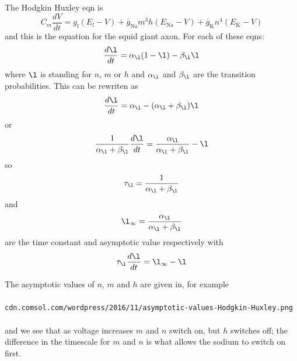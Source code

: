 \documentclass[a4paper,12pt]{article}
\begin{document}
\begin{enumerate}
The Hodgkin Huxley eqn is
\begin{equation}
C_m\frac{dV}{dt}=g_l(E_l-V)+\bar{g}_\text{Na}m^3h(E_\text{Na}-V)+\bar{g}_\text{K}n^4(E_\text{K}-V)
\end{equation}
and this is the equation for the squid giant axon. For each of these eqns:
\begin{equation}
\frac{d\l}{dt} =\alpha_{\l} (1-\l)-\beta_{\l} \l
\end{equation}
where $\l$ is standing for $n$, $m$ or $h$ and $\alpha_{\l}$ and
$\beta_{\l}$ are the transition probabilities. This can be rewriten as
\begin{equation}
\frac{d\l}{dt} =\alpha_{\l}-(\alpha_{\l}+\beta_{\l}) \l
\end{equation}
or
\begin{equation}
\frac{1}{\alpha_{\l}+\beta_{\l}}\frac{d\l}{dt} =\frac{\alpha_{\l}}{\alpha_{\l}+\beta_{\l}}- \l
\end{equation}
so 
\begin{equation}
\tau_{\l}=\frac{1}{\alpha_{\l}+\beta_{\l}}
\end{equation}
and
\begin{equation}
\l_\infty=\frac{\alpha_{\l}}{\alpha_{\l}+\beta_{\l}}
\end{equation}
are the time constant and asymptotic value respectively with
\begin{equation}
\tau_{\l}\frac{d\l}{dt} =\l_\infty- \l
\end{equation}


The asymptotic values of $n$, $m$ and $h$ are given in, for example\\
\\
\texttt{cdn.comsol.com/wordpress/2016/11/asymptotic-values-Hodgkin-Huxley.png}\\
\\
and we see that as voltage increases $m$ and $n$ switch on, but $h$ switches off; the difference in the timescale for $m$ and $n$ is what allows the sodium to switch on first.
 \fi

\end{enumerate}
\end{document}
